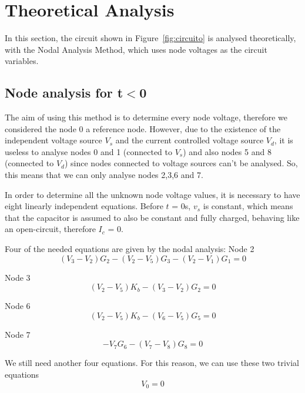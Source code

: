\section{Theoretical Analysis}
\label{sec:analysis}

\hspace{0,5cm} In this section, the circuit shown in Figure~\ref{fig:circuito} is analysed theoretically, with the Nodal Analysis Method, which uses node voltages as the circuit variables. 


\subsection{Node analysis for t$<$0}

\hspace{0,5cm} The aim of using this method is to determine every node voltage, therefore we considered the node 0 a reference node. However, due to the existence of the independent voltage source $V_s$ and the current controlled voltage source $V_d$, it is useless to analyse nodes 0 and 1 (connected to $V_s$) and also nodes 5 and 8 (connected to $V_d$) since nodes connected to voltage sources can't be analysed. So, this means that we can only analyse nodes 2,3,6 and 7.

In order to determine all the unknown node voltage values, it is necessary to have eight linearly independent equations. Before $t$ = 0s, $v_s$ is constant, which means that the capacitor is assumed to also be constant and fully charged, behaving like an open-circuit, therefore $I_c$ = 0.

Four of the needed equations are given by the nodal analysis:
Node 2
\begin{equation}
(V_3-V_2)G_2 - (V_2-V_5)G_3 - (V_2-V_1)G_1 = 0
\label{eq:1.1}
\end{equation}

Node 3
\begin{equation}
(V_2-V_5)K_b - (V_3-V_2)G_2 = 0
\label{eq:1.2}
\end{equation}

Node 6
\begin{equation}
(V_2-V_5)K_b - (V_6-V_5)G_5 = 0
\label{eq:1.3}
\end{equation}

Node 7
\begin{equation}
-V_7 G_6 - (V_7-V_8)G_8 = 0
\label{eq:1.4}
\end{equation}

We still need another four equations. For this reason, we can use these two trivial equations
\begin{equation}
V_0=0
\label{eq:1.5}
\end{equation}


